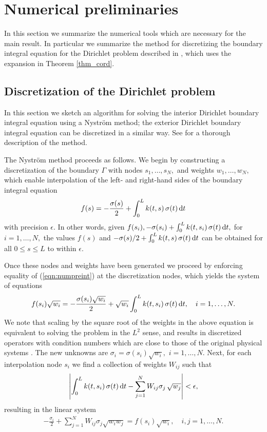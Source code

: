 
\section{Numerical preliminaries \label{sec:nprelim}}
In this section we summarize the numerical tools which are necessary for the main result. In particular we summarize the method for discretizing the boundary integral equation for the Dirichlet problem described in \cite{hoskins2019numerical}, which uses the expansion in Theorem \ref{thm_cord}.
\subsection{Discretization of the Dirichlet problem}\label{sec:disc_dir}
In this section we sketch an algorithm for solving the interior Dirichlet boundary integral equation using a Nystr\"{o}m method; the exterior Dirichlet boundary integral equation can be discretized in a similar way. See \cite{hoskins2019numerical} for a thorough description of the method. 

The Nystr\"{o}m method proceeds as follows. We begin by constructing a discretization of the boundary $\Gamma$ with nodes $s_1,\dots,s_N,$ and weights $w_1,\dots,w_N,$ which enable interpolation of the left- and right-hand sides of the boundary integral equation
\begin{align}\label{eqn:numpreint}
f(s) = -\frac{\sigma(s)}{2} + \int_0^L k(t,s) \,\sigma(t)\, {\rm d} t
\end{align}
with precision $\epsilon.$ In other words, given $f(s_i),-\sigma(s_i) + \int_0^L k(t,s_i) \,\sigma(t)\, {\rm d} t,$ for $i=1,\dots,N,$ the values $f(s)$ and $-\sigma(s)/2 + \int_0^L k(t,s) \,\sigma(t)\, {\rm d} t$ can be obtained for all $0 \le s \le L$ to within $\epsilon.$

Once these nodes and weights have been generated we proceed by enforcing equality of (\ref{eqn:numpreint}) at the discretization nodes, which yields the system of equations
\begin{align}
f(s_i) \sqrt{w_i} = -\frac{\sigma(s_i)\sqrt{w_i}}{2} +  \sqrt{w_i}\int_0^L k(t,s_i)\, \sigma(t)\,{\rm d}t,\quad i=1,\dots,N. \label{eqn_1std}
\end{align}
We note that scaling by the square root of the weights in the above equation is equivalent to solving the problem in the $L^2$ sense, and results in discretized operators with condition numbers which are close to those of the original physical systems \cite{bremer3}. The new unknowns are $\sigma_i = \sigma(s_i) \sqrt{w_i},$ $i=1,\dots,N.$ Next, for each interpolation node $s_i$ we find a collection of weights $W_{ij}$ such that
\begin{align}
\left|\int_0^L k(t,s_i)\, \sigma(t)\,{\rm d}t- \sum_{j=1}^N W_{ij} \sigma_j\, \sqrt{w_j} \right| < \epsilon,
\end{align}
resulting in the linear system
\begin{align}
  -\frac{\sigma_i}{2} +  \sum_{j=1}^N W_{ij} \sigma_j \sqrt{w_i w_j}=f(s_i) \sqrt{w_i},\quad i,j=1,\dots,N. 
\end{align}

